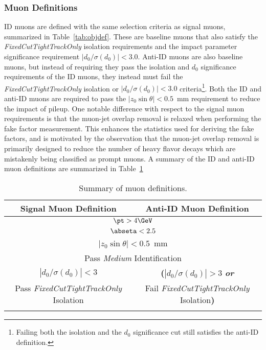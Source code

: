   \FloatBarrier
\subsubsection{Muon Definitions}

ID muons are defined with the same selection criteria as signal muons, summarized in Table~\ref{tab:objdef}. These are baseline muons that also satisfy the \textit{FixedCutTightTrackOnly} isolation requirements and the impact parameter significance requirement $|d_0/\sigma(d_0)|<3.0$.  Anti-ID muons are also baseline muons, but instead of requiring they pass the isolation and $d_0$ significance requirements of the ID muons, they instead must fail the \textit{FixedCutTightTrackOnly} isolation or $|d_0/\sigma(d_0)|<3.0$ criteria\footnote{Failing both the isolation and the $d_0$ significance cut still satisfies the anti-ID definition.}. Both the ID and anti-ID muons are required to pass the $|z_0\sin\theta| < 0.5$~mm requirement to reduce the impact of pileup.  One notable difference with respect to the signal muon requirements is that the muon-jet overlap removal is relaxed when performing the fake factor measurement.  This enhances the statistics used for deriving the fake factors, and is motivated by the observation that the muon-jet overlap removal is primarily designed to reduce the number of heavy flavor decays which are mistakenly being classified as prompt muons.  A summary of the ID and anti-ID muon definitions are summarized in Table~\ref{tab:AllMuDefs}
\begin{table}[!htb]
\begin{center}
\begin{tabular}{c|c}
\hline
Signal Muon Definition  & Anti-ID Muon Definition \\
\hline \hline
\multicolumn{2}{c}{$\pt > 4\GeV$}      \\
\multicolumn{2}{c}{$\abseta < 2.5$ }     \\
\multicolumn{2}{c}{$|z_0\sin\theta| < 0.5$~mm} \\
\multicolumn{2}{c}{Pass \textit{Medium} Identification}     \\
$|d_0/\sigma(d_0)| < 3$  &   \textbf{(}$|d_0/\sigma(d_0)| > 3$ \textbf{\textit{or}}\\
Pass \textit{FixedCutTightTrackOnly} Isolation  & Fail \textit{FixedCutTightTrackOnly} Isolation\textbf{)} \\   \\
\hline
\end{tabular}
\caption{Summary of muon definitions.}
\label{tab:AllMuDefs}
\end{center}
\end{table}

